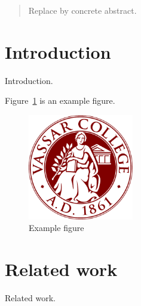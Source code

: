 \documentclass[twocolumn, 10pt, conference]{IEEEtran}
\begin{document}

\setlength{\belowdisplayskip}{10pt} \setlength{\belowdisplayshortskip}{10pt}
\setlength{\abovedisplayskip}{10pt} \setlength{\abovedisplayshortskip}{10pt}
\setlength{\textfloatsep}{10pt plus 1.0pt minus 2.0pt}
\setlength{\floatsep}{10pt plus 1.0pt minus 2.0pt}
\setlength{\intextsep}{10pt plus 1.0pt minus 2.0pt}

\begin{abstract}
Replace by concrete abstract.
\end{abstract}


\section{Introduction}
\label{sec:introduction}



Introduction.

Figure~\ref{fig:example} is an example figure.

\begin{figure}[t]
\centering
    \includegraphics[width=0.41\textwidth]{fig/example-fig}
     \caption{Example figure}
      \label{fig:example}
\end{figure}

\section{Related work}
\label{sec:related-work}
Related work.
\end{document}
